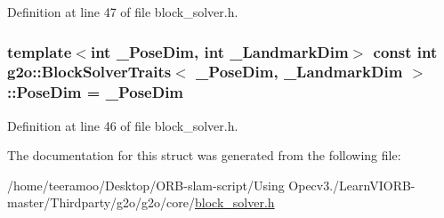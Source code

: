 Definition at line 47 of file block\+\_\+solver.\+h.

\subsubsection[{\texorpdfstring{Pose\+Dim}{PoseDim}}]{\setlength{\rightskip}{0pt plus 5cm}template$<$int \+\_\+\+Pose\+Dim, int \+\_\+\+Landmark\+Dim$>$ const int {\bf g2o\+::\+Block\+Solver\+Traits}$<$ \+\_\+\+Pose\+Dim, \+\_\+\+Landmark\+Dim $>$\+::Pose\+Dim = \+\_\+\+Pose\+Dim\hspace{0.3cm}{\ttfamily [static]}}\hypertarget{structg2o_1_1BlockSolverTraits_a90a03bcfc60b629da5601f6df9514297}{}\label{structg2o_1_1BlockSolverTraits_a90a03bcfc60b629da5601f6df9514297}


Definition at line 46 of file block\+\_\+solver.\+h.



The documentation for this struct was generated from the following file\+:\begin{DoxyCompactItemize}
\item 
/home/teeramoo/\+Desktop/\+O\+R\+B-\/slam-\/script/\+Using Opecv3./\+Learn\+V\+I\+O\+R\+B-\/master/\+Thirdparty/g2o/g2o/core/\hyperlink{block__solver_8h}{block\+\_\+solver.\+h}\end{DoxyCompactItemize}
